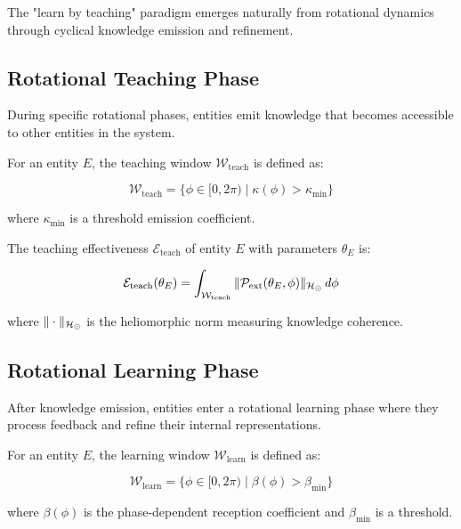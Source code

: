 The "learn by teaching" paradigm emerges naturally from rotational dynamics through cyclical knowledge emission and refinement.

\subsection{Rotational Teaching Phase}

During specific rotational phases, entities emit knowledge that becomes accessible to other entities in the system.

\begin{definition}
For an entity $E$, the teaching window $\mathcal{W}_{\text{teach}}$ is defined as:

\begin{equation}
\mathcal{W}_{\text{teach}} = \{\phi \in [0, 2\pi) \mid \kappa(\phi) > \kappa_{\text{min}}\}
\end{equation}

where $\kappa_{\text{min}}$ is a threshold emission coefficient.
\end{definition}

\begin{proposition}
The teaching effectiveness $\mathcal{E}_{\text{teach}}$ of entity $E$ with parameters $\theta_E$ is:

\begin{equation}
\mathcal{E}_{\text{teach}}(\theta_E) = \int_{\mathcal{W}_{\text{teach}}} \|\mathcal{P}_{\text{ext}}(\theta_E, \phi)\|_{\mathcal{H}_{\odot}} \, d\phi
\end{equation}

where $\|\cdot\|_{\mathcal{H}_{\odot}}$ is the heliomorphic norm measuring knowledge coherence.
\end{proposition}

\subsection{Rotational Learning Phase}

After knowledge emission, entities enter a rotational learning phase where they process feedback and refine their internal representations.

\begin{definition}
For an entity $E$, the learning window $\mathcal{W}_{\text{learn}}$ is defined as:

\begin{equation}
\mathcal{W}_{\text{learn}} = \{\phi \in [0, 2\pi) \mid \beta(\phi) > \beta_{\text{min}}\}
\end{equation}

where $\beta(\phi)$ is the phase-dependent reception coefficient and $\beta_{\text{min}}$ is a threshold.
\end{definition}

